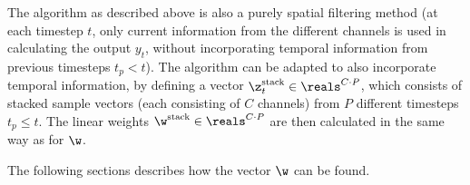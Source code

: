 The algorithm as described above is also a purely spatial filtering method
(at each timestep $t$, only current information from the different channels
is used in calculating the output $y_t$, without incorporating temporal
information from previous timesteps $t_p < t$). The algorithm can be adapted
to also incorporate temporal information, by defining a vector
$\z^\text{stack}_t \in
\reals^{C \cdot P}$, which consists of stacked sample vectors (each
consisting of $C$ channels) from $P$ different timesteps $t_p \leq t$. The
linear weights $\w^\text{stack} \in \reals^{C \cdot P}$ are then calculated
in the same way as for $\w$.

The following sections describes how the vector $\w$ can be found.

